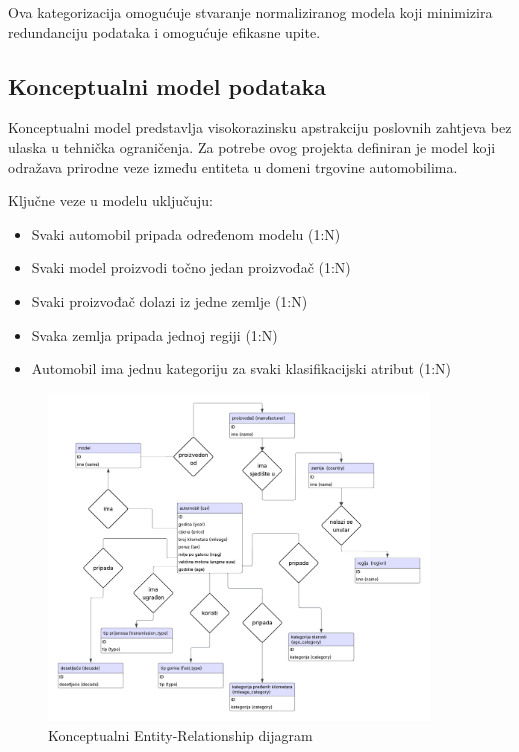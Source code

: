 Ova kategorizacija omogućuje stvaranje normaliziranog modela koji minimizira redundanciju podataka i omogućuje efikasne upite.

\subsection{Konceptualni model podataka}

Konceptualni model predstavlja visokorazinsku apstrakciju poslovnih zahtjeva bez ulaska u tehnička ograničenja. Za potrebe ovog projekta definiran je model koji odražava prirodne veze između entiteta u domeni trgovine automobilima.

Ključne veze u modelu uključuju:
\begin{itemize}
    \item Svaki automobil pripada određenom modelu (1:N)
    \item Svaki model proizvodi točno jedan proizvođač (1:N)
    \item Svaki proizvođač dolazi iz jedne zemlje (1:N)
    \item Svaka zemlja pripada jednoj regiji (1:N)
    \item Automobil ima jednu kategoriju za svaki klasifikacijski atribut (1:N)
\end{itemize}

\begin{figure}[H]
    \centering
    \includegraphics[width=0.9\textwidth]{slike/relational_model/er-dijagram.png}
    \caption{Konceptualni Entity-Relationship dijagram}
    \label{fig:er-dijagram}
\end{figure}


